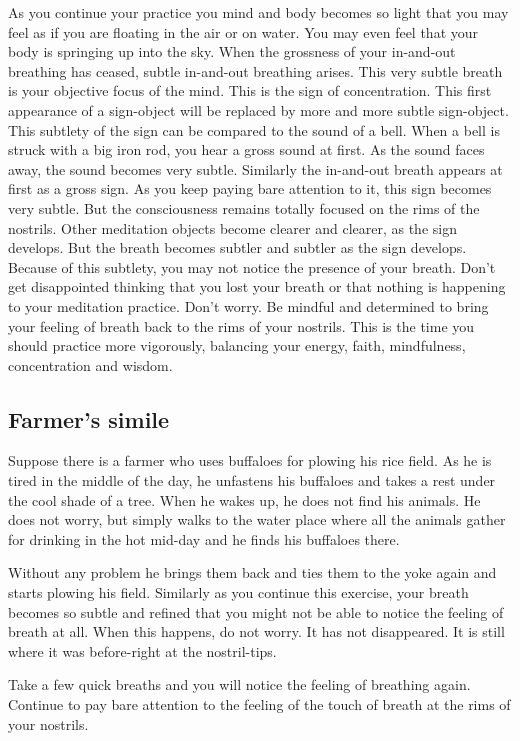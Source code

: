 As you continue your practice you mind and body becomes so light that you may
feel as if you are floating in the air or on water.
You may even feel that your body is springing up into the sky. When the grossness of your in-and-out breathing has ceased,
subtle in-and-out breathing arises. This very subtle breath is your objective focus of the mind. This is the sign of concentration.
This first appearance of a sign-object will be replaced by more and more subtle
sign-object. This subtlety of the sign can be compared to the sound of a bell.
When a bell is struck with a big iron rod, you hear a gross sound at first. As
the sound faces away, the sound becomes very subtle. Similarly the in-and-out
breath appears at first as a gross sign. As you keep paying bare attention to
it, this sign becomes very subtle. But the consciousness remains totally focused
on the rims of the nostrils. Other meditation objects become clearer and clearer, as the sign
develops. But the breath becomes subtler and subtler as the sign develops.
Because of this subtlety, you may not notice the presence of your breath. Don't
get disappointed thinking that you lost your breath or that nothing is happening
to your meditation practice. Don't worry. Be mindful and determined to bring
your feeling of breath back to the rims of your nostrils. This is the time you
should practice more vigorously, balancing your energy, faith, mindfulness,
concentration and wisdom.

\subsection*{Farmer's simile}
Suppose there is a farmer who uses buffaloes for plowing his
rice field. As he is tired in the middle of the day, he unfastens his buffaloes
and takes a rest under the cool shade of a tree. When he wakes up, he does not
find his animals. He does not worry, but simply walks to the water place where
all the animals gather for drinking in the hot mid-day and he finds his
buffaloes there.

Without any problem he brings them back and ties them to the yoke again and
starts plowing his field.
Similarly as you continue this exercise, your breath becomes so subtle and refined that you might not be able to notice the feeling
of breath at all. When this happens, do not worry. It has not disappeared. It is still where it was before-right at the nostril-tips.

Take a few quick breaths and you will notice the feeling of breathing again.
Continue to pay bare attention to the feeling of the touch of breath at the rims
of your nostrils.

